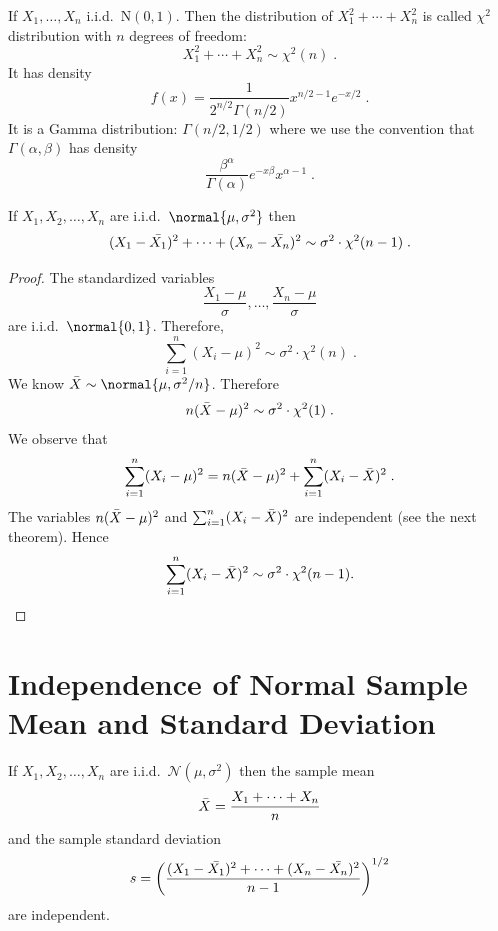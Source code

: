 \begin{definition}
If $X_1,\ldots,X_n$ i.i.d.\ $\mathrm{N}(0,1)$. Then the distribution of $X_1^2+\cdots+X_n^2$ is called $\chi^2$ distribution with $n$ degrees of freedom:
\[
X_1^2 + \cdots + X_n^2 \sim \chi^2(n) \;.
\]
It has density
\[
f(x) = \frac{1}{2^{n/2}\Gamma(n/2)}x^{n/2-1}e^{-x/2}\;.
\]
It is a Gamma distribution: $\Gamma(n/2,1/2)$ where we use the convention that $\Gamma(\alpha,\beta)$ has density
\[
\frac{\beta^\alpha}{\Gamma(\alpha)}
e^{-x\beta}x^{\alpha-1}\;.
\]
\end{definition}

\begin{theorem}
If $X_1,X_2,\ldots,X_n$ are i.i.d.\ $\normal{\mu,\sigma^2}$ then 
\[
(X_1-\Bar{X_1})^2+\cdots+(X_n-\Bar{X_n})^2  
\sim \sigma^2 \cdot \chi^2(n-1)\;.
\]
\end{theorem}

\begin{proof} 
The standardized variables 
\[
\frac{X_1-\mu}{\sigma}, \ldots, \frac{X_n-\mu}{\sigma}
\]
are i.i.d.\ $\normal{0,1}$. Therefore,
\[
\sum_{i=1}^n (X_i-\mu)^2 \sim \sigma^2 \cdot \chi^2(n) \;.
\]
We know $\Bar{X}\sim\normal{\mu,\sigma^2/n}$. Therefore
\[
n (\Bar{X}-\mu)^2 \sim \sigma^2 \cdot \chi^2(1) \;.
\]
We observe that
\[
\sum_{i=1}^n (X_i-\mu)^2 
= n(\Bar{X}-\mu)^2 
+ \sum_{i=1}^n (X_i-\Bar{X})^2 \;.
\]
The variables $n(\Bar{X}-\mu)^2$ and $\sum_{i=1}^n (X_i-\Bar{X})^2$ are independent (see the next theorem). Hence 
\[
\sum_{i=1}^n (X_i-\Bar{X})^2 \sim \sigma^2 \cdot \chi^2(n-1).
\]    
\end{proof}

\newpage

\section{Independence of Normal Sample Mean and Standard Deviation}

\begin{theorem}
If $X_1,X_2,\ldots,X_n$ are i.i.d.\ $\mathcal{N}(\mu,\sigma^2)$ then the sample mean
\[
\Bar{X} = \frac{X_1+\cdots+X_n}{n}
\]
and the sample standard deviation
\[
s = \left(\frac{(X_1-\Bar{X_1})^2+\cdots+(X_n-\Bar{X_n})^2}{n-1}\right)^{1/2}
\]
are independent.
\end{theorem}

